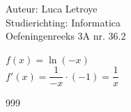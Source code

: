 \documentclass[a4paper]{article}
\begin{document}
  
\noindent \large Auteur: Luca Letroye        \\
\noindent \large Studierichting: Informatica \\
\noindent \large Oefeningenreeks 3A nr. 36.2 \\

\medskip

\normalsize

$f(x) = \ln(-x)$\\

$f'(x) = \dfrac{1}{-x} \cdot (-1) = \dfrac{1}{x}$\\



\begin{thebibliography}{999}
\end{thebibliography}
\end{document}
